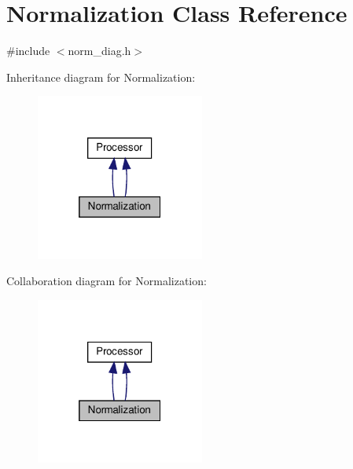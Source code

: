\hypertarget{classNormalization}{}\section{Normalization Class Reference}
\label{classNormalization}


{\ttfamily \#include $<$norm\+\_\+diag.\+h$>$}



Inheritance diagram for Normalization\+:\nopagebreak
\begin{figure}[H]
\begin{center}
\leavevmode
\includegraphics[width=157pt]{classNormalization__inherit__graph}
\end{center}
\end{figure}


Collaboration diagram for Normalization\+:\nopagebreak
\begin{figure}[H]
\begin{center}
\leavevmode
\includegraphics[width=157pt]{classNormalization__coll__graph}
\end{center}
\end{figure}
